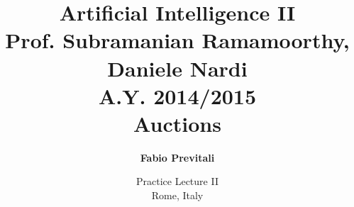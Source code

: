\documentclass{beamer}
\title[Artificial Intelligence II - Practice Lecture I]{\Large Artificial Intelligence II\\ \small \vspace{0.05cm} Prof. Subramanian Ramamoorthy, Daniele Nardi \\ \footnotesize \vspace{0.05cm} A.Y. 2014/2015 \\ \huge \vspace{0.8cm} Auctions}
\subtitle{}
\author[Fabio Previtali]{\Large\textbf{Fabio Previtali}}
\date[May 20, 2015]{Practice Lecture II\\Rome, Italy}
\begin{document}
\begin{frame}[plain]
	\titlepage
\end{frame}


\end{document}
